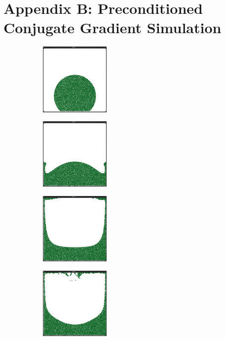 \section*{Appendix B: Preconditioned Conjugate Gradient Simulation}
\begin{figure}[ht!]
\centering
\begin{subfigure}[]{}
\includegraphics[height=35mm]{png/pcg0.png}
\end{subfigure}
\begin{subfigure}[]{}
\includegraphics[height=35mm]{png/pcg1.png}
\end{subfigure}
\begin{subfigure}[]{}
\includegraphics[height=35mm]{png/pcg2.png}
\end{subfigure}
\begin{subfigure}[]{}
\includegraphics[height=35mm]{png/pcg3.png}
\end{subfigure}
\begin{subfigure}[]{}

\end{subfigure}
\end{figure}
